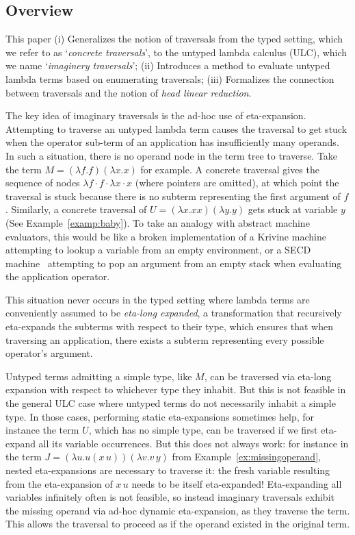 \documentclass{elsarticle}
\theoremstyle{plain}
\theoremstyle{definition}
\begin{document}
\subsection{Overview}
This paper
(i) Generalizes the notion of traversals from the typed setting, which we refer to as `\emph{concrete traversals}', to the untyped lambda calculus (ULC), which we name `\emph{imaginery traversals}';
(ii) Introduces a method to evaluate untyped lambda terms based on enumerating traversals;
(iii) Formalizes the connection between traversals and the notion of \emph{head linear reduction}.

The key idea of imaginary traversals is the ad-hoc use of eta-expansion. Attempting to traverse an untyped lambda term causes the traversal to get stuck when the operator sub-term of an application has insufficiently many operands. In such a situation, there is no operand node in the term tree to traverse. Take the term $M = (\lambda f.f)(\lambda x.x)$ for example. A concrete traversal gives the sequence of nodes $\lambda f \cdot f \cdot \lambda x \cdot x$ (where pointers are omitted), at which point the traversal is stuck because there is no subterm representing the first argument of $f$.
Similarly, a concrete traversal of $U = (\lambda x. x x)(\lambda y. y)$ gets  stuck at variable $y$ (See Example~\ref{examp:baby}). To take an analogy with abstract machine evaluators, this would be like a broken implementation of a Krivine machine~\cite{Krivine2007} attempting to lookup a variable from an empty environment, or a SECD machine~\cite{landin-secd} attempting to pop an argument from an empty stack when evaluating the application operator.

This situation never occurs in the typed setting where lambda terms are
conveniently assumed to be \emph{eta-long expanded}, a transformation that recursively eta-expands the subterms with respect to their type,
which ensures that when traversing an application, there exists a subterm representing every possible operator's argument.

Untyped terms admitting a simple type, like $M$, can be traversed via eta-long expansion with respect to whichever type they inhabit.
But this is not feasible in the general ULC case where untyped terms do not necessarily inhabit a simple type. In those cases, performing static eta-expansions sometimes help, for instance the term $U$, which has no simple type, can be traversed if we first eta-expand all its variable occurrences. But this does not always work: for instance in the term
 $J = (\lambda u . u(x\, u)) (\lambda v . v\, y)$ from
 Example~\ref{ex:missingoperand}, nested eta-expansions are necessary to traverse it:
 the fresh variable resulting from the eta-expansion of $x\, u$ needs to be itself eta-expanded! Eta-expanding all variables infinitely often is not feasible, so instead imaginary traversals
  exhibit the missing operand via ad-hoc dynamic eta-expansion, as they traverse the term.
 This allows the traversal to proceed as if the operand existed in the original term.
\end{document}
